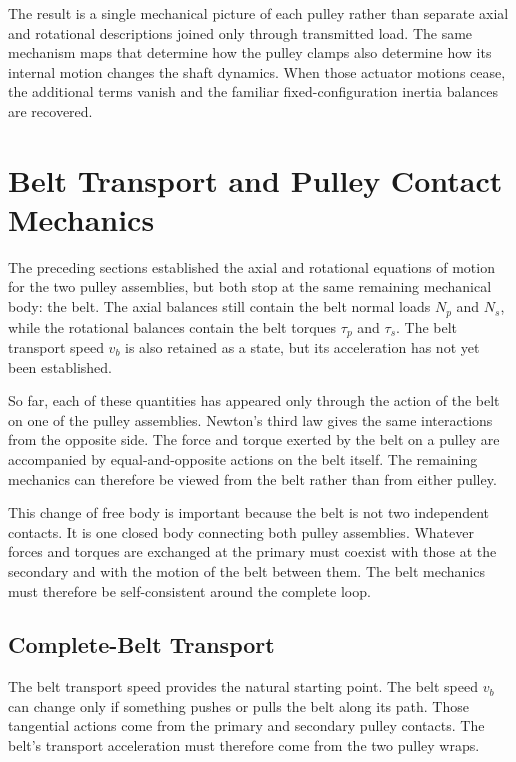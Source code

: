 \documentclass[11pt]{report}
\numberwithin{equation}{section}
\begin{document}
The result is a single mechanical picture of each pulley rather than separate
axial and rotational descriptions joined only through transmitted load. The
same mechanism maps that determine how the pulley clamps also determine how
its internal motion changes the shaft dynamics. When those actuator motions
cease, the additional terms vanish and the familiar fixed-configuration
inertia balances are recovered.

\section{Belt Transport and Pulley Contact Mechanics}
\label{sec:belt_transport_contact}

The preceding sections established the axial and rotational equations of
motion for the two pulley assemblies, but both stop at the same remaining
mechanical body: the belt. The axial balances still contain the belt normal
loads \(N_p\) and \(N_s\), while the rotational balances contain the belt
torques \(\tau_p\) and \(\tau_s\). The belt transport speed \(v_b\) is also
retained as a state, but its acceleration has not yet been established.

So far, each of these quantities has appeared only through the action of the
belt on one of the pulley assemblies. Newton's third law gives the same
interactions from the opposite side. The force and torque exerted by the belt
on a pulley are accompanied by equal-and-opposite actions on the belt itself.
The remaining mechanics can therefore be viewed from the belt rather than
from either pulley.

This change of free body is important because the belt is not two independent
contacts. It is one closed body connecting both pulley assemblies. Whatever
forces and torques are exchanged at the primary must coexist with those at the
secondary and with the motion of the belt between them. The belt mechanics
must therefore be self-consistent around the complete loop.

\subsection{Complete-Belt Transport}

\label{sec:complete_belt_transport}

The belt transport speed provides the natural starting point. The belt speed
\(v_b\) can change only if something pushes or pulls the belt along its path.
Those tangential actions come from the primary and secondary pulley contacts.
The belt's transport acceleration must therefore come from the two pulley
wraps.
\end{document}
